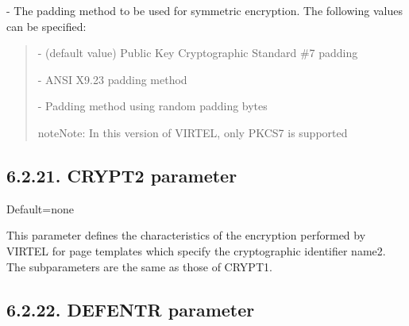 \documentclass[letterpaper,10pt,english]{sphinxmanual}
\begin{document}
 - The padding method to be used for symmetric encryption. The following values can be specified:
\begin{quote}

 - (default value) Public Key Cryptographic Standard \#7 padding

 - ANSI X9.23 padding method

 - Padding method using random padding bytes

\begin{sphinxadmonition}{note}{Note:}
In this version of VIRTEL, only PKCS7 is supported
\end{sphinxadmonition}
\end{quote}


\subsection{6.2.21. CRYPT2 parameter}
\label{\detokenize{Installation_Guide:crypt2-parameter}}
\begin{sphinxVerbatim}[commandchars=\\\{\}]
\PYG{p}{[}\PYG{p}{]}\PYG{p}{[}\PYG{p}{]}\PYG{p}{[}\PYG{p}{]}\PYG{p}{[}\PYG{p}{]}\PYG{p}{[}\PYG{p}{]}\PYG{p}{[}\PYG{p}{]}
\end{sphinxVerbatim}

Default=none

This parameter defines the characteristics of the encryption performed by VIRTEL for page templates which specify the cryptographic identifier name2. The subparameters are the same as those of CRYPT1.


\subsection{6.2.22. DEFENTR parameter}
\label{\detokenize{Installation_Guide:defentr-parameter}}
\begin{sphinxVerbatim}[commandchars=\\\{\}]
 
\end{sphinxVerbatim}
\end{document}
